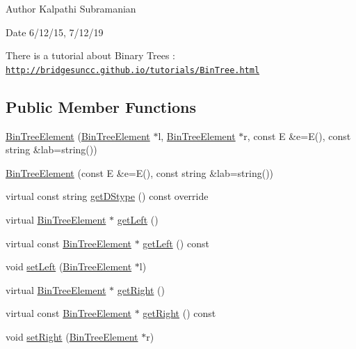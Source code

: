 \begin{DoxyAuthor}{Author}
Kalpathi Subramanian 
\end{DoxyAuthor}
\begin{DoxyDate}{Date}
6/12/15, 7/12/19
\end{DoxyDate}
There is a tutorial about Binary Trees \+: \href{http://bridgesuncc.github.io/tutorials/BinTree.html}{\tt http\+://bridgesuncc.\+github.\+io/tutorials/\+Bin\+Tree.\+html} \subsection*{Public Member Functions}
\begin{DoxyCompactItemize}
\item 
\hyperlink{classbridges_1_1datastructure_1_1_bin_tree_element_aaea6c57206cffc0be3204b971fcaf5dd}{Bin\+Tree\+Element} (\hyperlink{classbridges_1_1datastructure_1_1_bin_tree_element}{Bin\+Tree\+Element} $\ast$l, \hyperlink{classbridges_1_1datastructure_1_1_bin_tree_element}{Bin\+Tree\+Element} $\ast$r, const E \&e=E(), const string \&lab=string())
\item 
\hyperlink{classbridges_1_1datastructure_1_1_bin_tree_element_a0f17a369aeb864ea52cfd25ba6b48e89}{Bin\+Tree\+Element} (const E \&e=E(), const string \&lab=string())
\item 
virtual const string \hyperlink{classbridges_1_1datastructure_1_1_bin_tree_element_aef86e3663785972251547e409fdc757b}{get\+D\+Stype} () const override
\item 
virtual \hyperlink{classbridges_1_1datastructure_1_1_bin_tree_element}{Bin\+Tree\+Element} $\ast$ \hyperlink{classbridges_1_1datastructure_1_1_bin_tree_element_ab30cfe373892c52709d5f1df013a0c82}{get\+Left} ()
\item 
virtual const \hyperlink{classbridges_1_1datastructure_1_1_bin_tree_element}{Bin\+Tree\+Element} $\ast$ \hyperlink{classbridges_1_1datastructure_1_1_bin_tree_element_ae14a70e2d25ad62337c87059b0cadb48}{get\+Left} () const
\item 
void \hyperlink{classbridges_1_1datastructure_1_1_bin_tree_element_a3b3caddd57fd31963b248b4dbcf3df27}{set\+Left} (\hyperlink{classbridges_1_1datastructure_1_1_bin_tree_element}{Bin\+Tree\+Element} $\ast$l)
\item 
virtual \hyperlink{classbridges_1_1datastructure_1_1_bin_tree_element}{Bin\+Tree\+Element} $\ast$ \hyperlink{classbridges_1_1datastructure_1_1_bin_tree_element_ae1e6bde8cc03cf5da5a7930354fdf592}{get\+Right} ()
\item 
virtual const \hyperlink{classbridges_1_1datastructure_1_1_bin_tree_element}{Bin\+Tree\+Element} $\ast$ \hyperlink{classbridges_1_1datastructure_1_1_bin_tree_element_a795b1696d628b55dafb2bc1aa961843a}{get\+Right} () const
\item 
void \hyperlink{classbridges_1_1datastructure_1_1_bin_tree_element_a59a1f7bac555e8a9bd88fd4aa1bd9b82}{set\+Right} (\hyperlink{classbridges_1_1datastructure_1_1_bin_tree_element}{Bin\+Tree\+Element} $\ast$r)
\end{DoxyCompactItemize}
